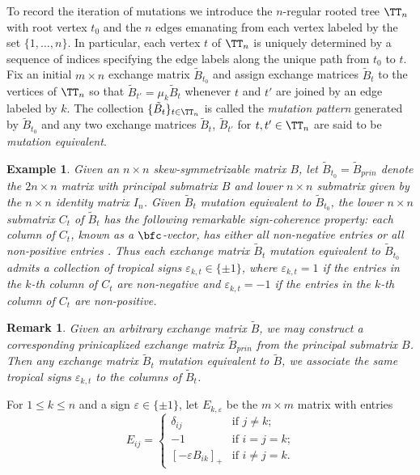 \documentclass{amsart}
\newtheorem{remark}[theorem]{Remark}
\newtheorem{example}[theorem]{Example}
\newcommand{\bfx}{\mathbf{x}}
\begin{document}
To record the iteration of mutations we introduce the $n$-regular rooted tree $\TT_n$ with root vertex $t_0$ and the $n$ edges emanating from each vertex labeled by the set $\{1,\ldots,n\}$.
In particular, each vertex $t$ of $\TT_n$ is uniquely determined by a sequence of indices specifying the edge labels along the unique path from $t_0$ to $t$.
Fix an initial $m\times n$ exchange matrix $\tilde B_{t_0}$ and assign exchange matrices $\tilde B_t$ to the vertices of $\TT_n$ so that $\tilde B_{t'}=\mu_k\tilde B_t$ whenever $t$ and $t'$ are joined by an edge labeled by $k$.
The collection $\{\tilde B_t\}_{t\in\TT_n}$ is called the \emph{mutation pattern} generated by $\tilde B_{t_0}$ and any two exchange matrices $\tilde B_t$, $\tilde B_{t'}$ for $t,t'\in\TT_n$ are said to be \emph{mutation equivalent}.

\begin{example}
  Given an $n\times n$ skew-symmetrizable matrix $B$, let $\tilde B_{t_0}=\tilde B_{prin}$ denote the $2n\times n$ matrix with principal submatrix $B$ and lower $n\times n$ submatrix given by the $n\times n$ identity matrix $I_n$.
  Given $\tilde B_t$ mutation equivalent to $\tilde B_{t_0}$, the lower $n\times n$ submatrix $C_t$ of $\tilde B_t$ has the following remarkable \emph{sign-coherence} property: each column of $C_t$, known as a $\bfc$-vector, has either all non-negative entries or all non-positive entries \cite{fomin-zelevinsky4,nakanishi-zelevinsky,gross-hacking-keel-kontsevich}.
  Thus each exchange matrix $\tilde B_t$ mutation equivalent to $\tilde B_{t_0}$ admits a collection of \emph{tropical signs} $\varepsilon_{k,t}\in\{\pm1\}$, where $\varepsilon_{k,t}=1$ if the entries in the $k$-th column of $C_t$ are non-negative and $\varepsilon_{k,t}=-1$ if the entries in the $k$-th column of $C_t$ are non-positive. 
\end{example}

\begin{remark}
  Given an arbitrary exchange matrix $\tilde B$, we may construct a corresponding prinicaplized exchange matrix $\tilde B_{prin}$ from the principal submatrix $B$.
  Then any exchange matrix $\tilde B_t$ mutation equivalent to $\tilde B$, we associate the same tropical signs $\varepsilon_{k,t}$ to the columns of $\tilde B_t$.
\end{remark}

For $1\le k\le n$ and a sign $\varepsilon\in\{\pm1\}$, let $E_{k,\varepsilon}$ be the $m\times m$ matrix with entries
\[E_{ij}=\begin{cases}\delta_{ij} & \text{if $j\ne k$;}\\ -1 & \text{if $i=j=k$;}\\ [-\varepsilon B_{ik}]_+ & \text{if $i\ne j=k$.}\end{cases}\]
\end{document}
